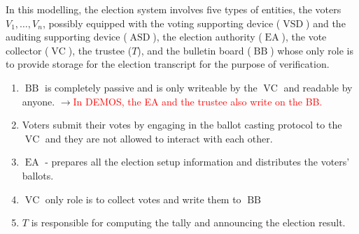 \documentclass[12pt]{article}
\newcommand{\fix}[2]{\sout{#1}$\rightarrow$\textcolor{red}{#2}}
\DeclareMathOperator{\vsd}{VSD}
\DeclareMathOperator{\asd}{ASD}
\DeclareMathOperator{\ea}{EA}
\DeclareMathOperator{\bb}{BB}
\DeclareMathOperator{\voc}{VC}
\begin{document}
In this modelling, the election system involves five types of entities, the voters $V_1, \dots , V_n$, possibly equipped with the voting supporting device ($\vsd$) and the auditing supporting device ($\asd$), the election authority ($\ea$), the vote collector ($\voc$), the trustee ($T$), and the bulletin board ($\bb$) whose only role is to provide storage for the election transcript for the purpose of verification. 
\begin{enumerate}
\item $\bb$ is completely passive and is only writeable by the $\voc$ and readable by anyone. \fix{}{In DEMOS, the EA and the trustee also write on the BB.}
\item Voters submit their votes by engaging in the ballot casting protocol to the $\voc$ and they are not allowed to interact with each other. 
\item $\ea$ - prepares all the election setup information and distributes the voters' ballots.
\item $\voc$ only role is to collect votes and write them to $\bb$
\item $T$ is responsible for computing the tally and announcing the election result.
\end{enumerate}
\end{document}
